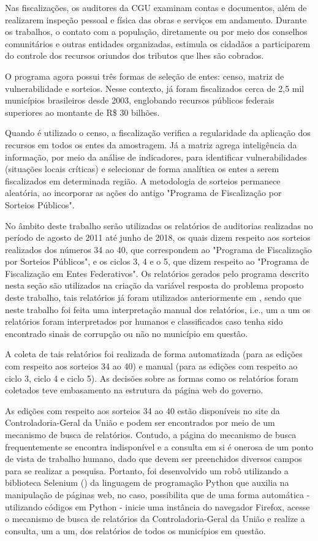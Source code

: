 Nas fiscalizações, os auditores da CGU examinam contas e documentos, além de realizarem inspeção pessoal e física das obras e serviços em andamento. Durante os trabalhos, o contato com a população, diretamente ou por meio dos conselhos comunitários e outras entidades organizadas, estimula os cidadãos a participarem do controle dos recursos oriundos dos tributos que lhes são cobrados.

O programa agora possui três formas de seleção de entes: censo, matriz de vulnerabilidade e sorteios. Nesse contexto, já foram fiscalizados cerca de 2,5 mil municípios brasileiros desde 2003, englobando recursos públicos federais superiores ao montante de R\$ 30 bilhões.

Quando é utilizado o censo, a fiscalização verifica a regularidade da aplicação dos recursos em todos os entes da amostragem. Já a matriz agrega inteligência da informação, por meio da análise de indicadores, para identificar vulnerabilidades (situações locais críticas) e selecionar de forma analítica os entes a serem fiscalizados em determinada região. A metodologia de sorteios permanece aleatória, ao incorporar as ações do antigo "Programa de Fiscalização por Sorteios Públicos".

No âmbito deste trabalho serão utilizadas os relatórios de auditorias realizadas no período de agosto de 2011 até junho de 2018, os quais dizem respeito aos sorteios realizados dos números 34 ao 40, que correspondem ao "Programa de Fiscalização por Sorteios Públicos", e os ciclos 3, 4 e o 5, que dizem respeito ao "Programa de Fiscalização em Entes Federativos". Os relatórios gerados pelo programa descrito nesta seção são utilizados na criação da variável resposta do problema proposto deste trabalho, tais relatórios já foram utilizados anteriormente em \citet{FerrazFinan2008}, sendo que neste trabalho foi feita uma interpretação manual dos relatórios, i.e., um a um os relatórios foram interpretados por humanos e classificados caso tenha sido encontrado sinais de corrupção ou não no município em questão.

A coleta de tais relatórios foi realizada de forma automatizada (para as edições com respeito aos sorteios 34 ao 40) e manual (para as edições com respeito ao ciclo 3, ciclo 4 e ciclo 5). As decisões sobre as formas como os relatórios foram coletados teve embasamento na estrutura da página web do governo.

As edições com respeito aos sorteios 34 ao 40 estão disponíveis no site da Controladoria-Geral da União e podem ser encontrados por meio de um mecanismo de busca de relatórios. Contudo, a página do mecanismo de busca frequentemente se encontra indisponível e a consulta em si é onerosa de um ponto de vista de trabalho humano, dado que devem ser preenchidos diversos campos para se realizar a pesquisa. Portanto, foi desenvolvido um robô utilizando a biblioteca Selenium (\citet{Selenium}) da linguagem de programação Python que auxilia na manipulação de páginas web, no caso, possibilita que de uma forma automática - utilizando códigos em Python - inicie uma instância do navegador Firefox, acesse o mecanismo de busca de relatórios da Controladoria-Geral da União e realize a consulta, um a um, dos relatórios de todos os municípios em questão.

